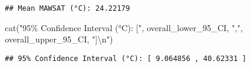 \documentclass[
]{article}
\newenvironment{Shaded}{\begin{snugshade}}{\end{snugshade}}
\newcommand{\FunctionTok}[1]{\textcolor[rgb]{0.00,0.00,0.00}{#1}}
\newcommand{\NormalTok}[1]{#1}
\newcommand{\SpecialCharTok}[1]{\textcolor[rgb]{0.00,0.00,0.00}{#1}}
\newcommand{\StringTok}[1]{\textcolor[rgb]{0.31,0.60,0.02}{#1}}
\begin{document}
\begin{verbatim}
## Mean MAWSAT (°C): 24.22179
\end{verbatim}

\begin{Shaded}
\begin{Highlighting}[]
\FunctionTok{cat}\NormalTok{(}\StringTok{"95\% Confidence Interval (°C): ["}\NormalTok{, overall\_lower\_95\_CI, }\StringTok{","}\NormalTok{, overall\_upper\_95\_CI, }\StringTok{"]}\SpecialCharTok{\textbackslash{}n}\StringTok{"}\NormalTok{)}
\end{Highlighting}
\end{Shaded}

\begin{verbatim}
## 95% Confidence Interval (°C): [ 9.064856 , 40.62331 ]
\end{verbatim}
\end{document}
